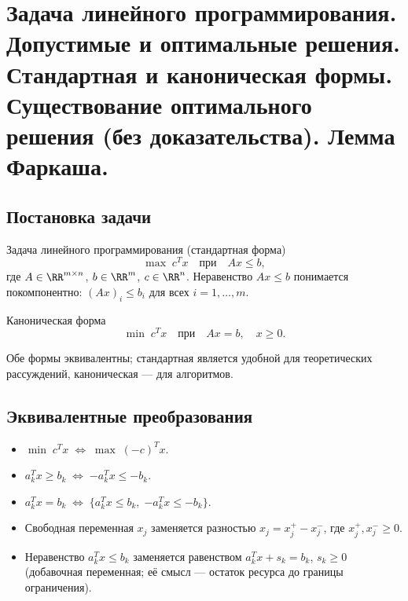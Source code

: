 
\section{Задача линейного программирования. Допустимые и оптимальные решения. Стандартная и каноническая формы. Существование оптимального решения (без доказательства). Лемма Фаркаша.}

\subsection{Постановка задачи}

\begin{Definition}{Задача линейного программирования (стандартная форма)}{}
	\[
	\max \; c^T x
	\quad \text{при} \quad
	Ax \le b,
	\]
	где $A \in \RR^{m \times n}$, $b \in \RR^m$, $c \in \RR^n$. Неравенство $Ax \le b$ понимается покомпонентно: $(Ax)_i \le b_i$ для всех $i = 1, \dots, m$.
\end{Definition}

\begin{Definition}{Каноническая форма}{}
	\[
	\min \; c^T x
	\quad \text{при} \quad
	Ax = b,\quad x \ge 0.
	\]
\end{Definition}

Обе формы эквивалентны; стандартная является удобной для теоретических рассуждений, каноническая --- для алгоритмов.

\subsection{Эквивалентные преобразования}

\begin{itemize}
	\item $\min\; c^T x \;\Longleftrightarrow\; \max\; (-c)^T x$.
	\item $a_k^T x \ge b_k \;\Longleftrightarrow\; {-a_k^T x \le -b_k}$.
	\item $a_k^T x = b_k \;\Longleftrightarrow\; \bigl\{a_k^T x \le b_k,\; {-a_k^T x \le -b_k}\bigr\}$.
	\item Свободная переменная $x_j$ заменяется разностью $x_j = x_j^+ - x_j^-$, где $x_j^+, x_j^- \ge 0$.
	\item Неравенство $a_k^T x \le b_k$ заменяется равенством $a_k^T x + s_k = b_k$, $s_k \ge 0$ (добавочная переменная; её смысл --- остаток ресурса до границы ограничения).
\end{itemize}

